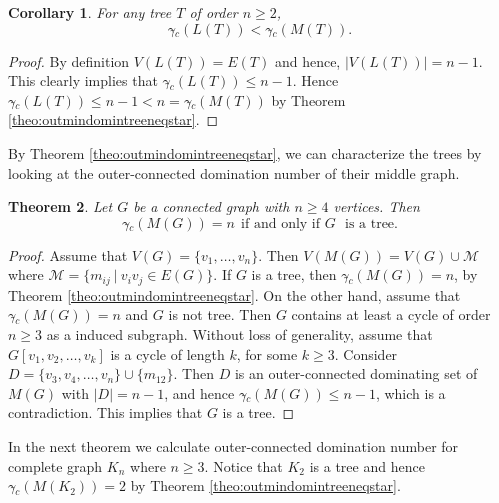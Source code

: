 \documentclass[a4paper,12pt, reqno]{amsart}
\newtheorem{Theorem}{Theorem}[section]
\newtheorem{Corollary}[Theorem]{Corollary}
\begin{document}
\begin{Corollary}\label{LTREE<MTREE}
For any tree $T$ of order $n\geq 2$, $$\gamma{\tilde{}} _{c}(L(T)) < \gamma{\tilde{}} _{c}(M(T)).$$
\end{Corollary}
\begin{proof}
By definition $V(L(T))=E(T)$ and hence, $|V(L(T))|=n-1$. This clearly implies that $\gamma{\tilde{}} _{c}(L(T))\leq n-1$. Hence $\gamma{\tilde{}} _{c}(L(T)) \leq n-1 <n= \gamma{\tilde{}} _{c}(M(T))$ by Theorem \ref{theo:outmindomintreeneqstar}.
\end{proof}
By Theorem \ref{theo:outmindomintreeneqstar}, we can characterize the trees by looking at the outer-connected domination number of their middle graph.
\begin{Theorem}\label{outGisnwhenGistree}
Let $G$ be a connected graph with $n\ge4$ vertices. Then
$$\gamma{\tilde{}} _{c}(M(G))= n~~\text{if and only if $G$~ is a tree}.$$
\end{Theorem}
\begin{proof}
Assume that $V(G)=\{v_1, \dots, v_n\}$. Then $V(M(G))=V(G) \cup \mathcal{M}$ where $\mathcal{M}=\{m_{ij}~|~ v_iv_j\in E(G)\}$. If $G$ is a tree, then $\gamma{\tilde{}} _{c}(M(G))= n$, by Theorem \ref{theo:outmindomintreeneqstar}. 
On the other hand, assume that $\gamma{\tilde{}} _{c}(M(G))= n$ and $G$ is not tree. Then $G$ contains at least a cycle of order $n \geq 3$ as a induced subgraph. Without loss of generality, assume that $G[v_1,v_2, \dots, v_k]$ is a cycle of length $k$,  for some $k \geq 3$. %
Consider $D=\{v_3,v_4, \dots, v_n\} \cup \{m_{12}\}$. Then $D$ is an outer-connected dominating set of $M(G)$ with $|D|=n-1$, and hence $\gamma{\tilde{}} _{c}(M(G))\leq n-1$, which is a contradiction. This implies that $G$ is a tree.
\end{proof}

In the next theorem we calculate outer-connected domination number for complete graph $K_n$ where $n \ge 3$. Notice that $K_2$ is a tree and hence $\gamma{\tilde{}} _{c}(M(K_{2}))=2$ by Theorem \ref{theo:outmindomintreeneqstar}.
\end{document}
